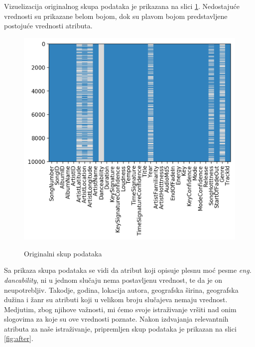 

Vizuelizacija originalnog skupa podataka je prikazana na slici \ref{fig:before}. Nedostaju\'c{}e vrednosti su prikazane belom bojom, dok su plavom bojom predstavljene postoju\'c{}e vrednosti atributa.
\begin{figure}[H]
    \includegraphics[scale=0.8]{resources/before_processing.png}
    \label{fig:before}
    \caption{Originalni skup podataka}
\end{figure}

 Sa prikaza skupa podataka se vidi da atribut koji opisuje plesnu mo\'c{} pesme \emph{eng. dancability}, ni u jednom slu\v{c}aju nema postavljenu vrednost, te da je on neupotrebljiv. Takodje, godina, lokacija autora, geografska \v{s}irina, geografska du\v{z}ina i \v{z}anr su atributi koji u velikom broju slu\v{c}ajeva nemaju vrednost. Medjutim, zbog njihove va\v{z}nosti, mi \'c{}emo svoje istra\v{z}ivanje vr\v{s}iti nad onim slogovima za koje su ove vrednosti poznate. Nakon izdvajanja relevantnih atributa za na\v{s}e istra\v{z}ivanje, pripremljen skup podataka je prikazan na slici \ref{fig:after}.

